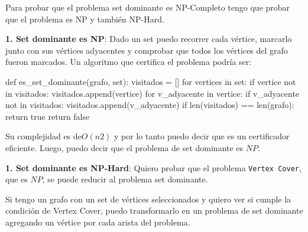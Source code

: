 \documentclass[../tp3_grupo404.tex]{subfiles}
\begin{document}
Para probar que el problema set dominante es NP-Completo tengo que probar que el problema
es NP y también NP-Hard.

\textbf{1. Set dominante es NP}: Dado un set puedo recorrer cada vértice, marcarlo junto con
sus vértices adyacentes y comprobar que todos los vértices del grafo fueron marcados.
Un algoritmo que certifica el problema podría ser:

\begin{alternate}
def es_set_dominante(grafo, set):
visitados = []
for vertices in set:
    if vertice not in visitados:
        visitados.append(vertice)
    for v_adyacente in vertice:
        if v_adyacente not in visitados:
            visitados.append(v_adyacente)
if len(visitados) == len(grafo):
    return true
return false
\end{alternate}

Su complejidad es de$ O(n2)$ y por lo tanto puedo decir que es un certificador eficiente.
Luego, puedo decir que el problema de set dominante es $NP$.

\textbf{1. Set dominante es NP-Hard}: Quiero probar que el problema \texttt{Vertex Cover},
que es $NP$, se puede reducir al problema set dominante.

Si tengo un grafo con un set de vértices seleccionados y quiero ver si cumple la condición
de Vertex Cover, puedo transformarlo en un problema de set dominante agregando un vértice
por cada arista del problema.

\end{document}
